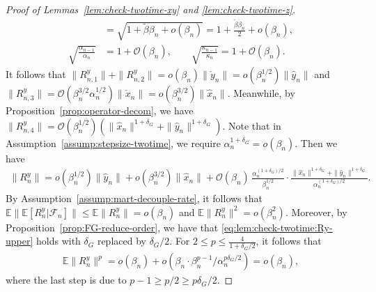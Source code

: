 \documentclass[11pt]{article}
\theoremstyle{plain}
\theoremstyle{definition}
\def\Gsmooth{{\delta_G}}
\def\invdiffslow{\tilde{\beta}}
\def\FM{{\mathcal F}}
\def\OM{{\mathcal O}}
\def\EB{{\mathbb E}}
\newcommand{\xhat}{{\hat{x}}}
\newcommand{\yhat}{{\hat{y}}}
\newcommand{\xcheck}{{\check{x}}}
\newcommand{\ycheck}{{\check{y}}}
\begin{document}
\begin{appendix}
\begin{proof}[Proof of Lemmas~\ref{lem:check-twotime-xy} and \ref{lem:check-twotime-z}]
\begin{align}
        & = \sqrt{1 + \invdiffslow \beta_{n}  + o(\beta_{n}) }
        = 1 + \frac{ \invdiffslow \beta_{n} }{2} + o(\beta_{n}), \nonumber \\
        \sqrt{ \frac{ \alpha_{n-1} }{\alpha_{n}} } 
        & = 1 + \OM(\beta_n),
        \qquad 
        \sqrt{ \frac{ \kappa_{n-1} }{\kappa_{n}} } 
        = 1 + \OM(\beta_n). \label{eq:lem:check-twotime:sqrtalpha}
\end{align}
It follows that $\| R_{n,1}^y \| +  \| R_{n,2}^y \| = o(\beta_{n}) \| \ycheck_{n} \| = o(\beta_{n}^{1/2}) \| \yhat_{n} \|  $
and  $\| R_{n,3}^y \| = \OM(\beta_{n}^{3/2} \alpha_{n}^{1/2}) \| \xcheck_{n} \| = o(\beta_{n}^{3/2}) \| \xhat_{n} \| $. 
Meanwhile, by Proposition~\ref{prop:operator-decom}, we have $ \| R_{n,4}^y \| = \OM(\beta_{n}^{1/2}) ( \| \xhat_{n} \|^{1+\Gsmooth} + \| \yhat_{n} \|^{1+\Gsmooth} ) $.
Note that in Assumption~\ref{assump:stepsize-twotime}, we require $\alpha_{n}^{1+\Gsmooth} = o(\beta_{n}) $.
Then we have
\begin{align}\label{eq:lem:check-twotime:Ry-upper}
    \| R_{n}^y \| = o(\beta_{n}^{1/2}) \| \yhat_{n} \| + o(\beta_{n}^{3/2}) \| \xhat_{n} \| + 
    \OM(\beta_{n}) \,
    \frac{ \alpha_{n}^{ (1+\Gsmooth) / 2 } }{ \beta_{n}^{1/2} } \cdot
    \frac{ \| \xhat_{n} \|^{1+\Gsmooth} + \| \yhat_{n} \|^{1+\Gsmooth} } {\alpha_{n}^{(1+\Gsmooth)/2} }.
\end{align}
By Assumption~\ref{assump:mart-decouple-rate}, it follows that $ \EB \| \EB[ R_{n}^y | \FM_{n} ] \| \le \EB \| R_{n}^y \| = o(\beta_{n})$ and $\EB \| R_{n}^y \|^2 = o(\beta_{n}^2)$.
Moreover, by Proposition~\ref{prop:FG-reduce-order}, we have that \eqref{eq:lem:check-twotime:Ry-upper} holds with $\Gsmooth$ replaced by $\Gsmooth / 2$.
For $2 \le p \le \frac{4}{1+\Gsmooth / 2}$, it follows that
\begin{align*}
    \EB \| R_{n}^y \|^p
    = o(\beta_{n})
    + o( \beta_{n} \cdot  \beta_{n}^{p-1} / \alpha_{n}^{ p \Gsmooth / 2} )
    = o(\beta_{n}),
\end{align*}
where the last step is due to $p-1 \ge p/2 \ge p \Gsmooth / 2$.
\vspace{0.2cm}


\end{proof}
\end{appendix}
\end{document}
